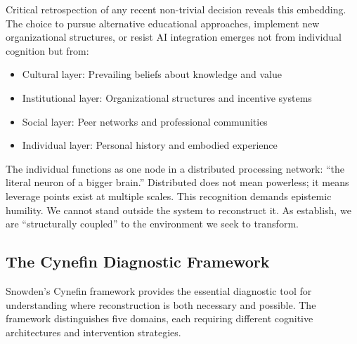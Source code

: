 Critical retrospection of any recent non-trivial decision reveals this embedding. The choice to pursue alternative educational approaches, implement new organizational structures, or resist AI integration emerges not from individual cognition but from:
\begin{itemize}
\item Cultural layer: Prevailing beliefs about knowledge and value \citep{schein1985}
\item Institutional layer: Organizational structures and incentive systems \citep{dimaggio1983}
\item Social layer: Peer networks and professional communities \citep{granovetter1985}
\item Individual layer: Personal history and embodied experience \citep{bourdieu1990}
\end{itemize}

The individual functions as one node in a distributed processing network: ``the literal neuron of a bigger brain.'' Distributed does not mean powerless; it means leverage points exist at multiple scales. This recognition demands epistemic humility. We cannot stand outside the system to reconstruct it. As \citet{maturana1987} establish, we are ``structurally coupled'' to the environment we seek to transform.

\subsection{The Cynefin Diagnostic Framework}

Snowden's Cynefin framework \citep{snowden2007} provides the essential diagnostic tool for understanding where reconstruction is both necessary and possible. The framework distinguishes five domains, each requiring different cognitive architectures and intervention strategies.

